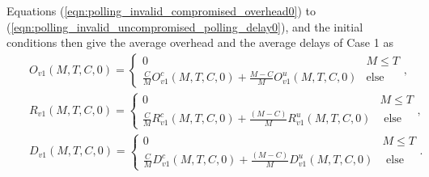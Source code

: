 \documentclass[12pt, onecolumn, draftcls]{IEEEtran}
\begin{document}
 Equations
(\ref{eqn:polling_invalid_compromised_overhead0}) to
(\ref{eqn:polling_invalid_uncompromised_polling_delay0}), and the
initial conditions then give the average overhead and the average
delays of Case 1 as
\begin{eqnarray*}
&&O_{v1}(M,T,C,0) = \left\{\begin{array}{ll} 0 & M \le T \\
\frac{C}{M}O_{v1}^c(M,T,C,0)+\frac{M-C}{M}O_{v1}^u(M,T,C,0) & \mbox{
else}
\end{array}, \right. \\
&&R_{v1}(M,T,C,0) = \left\{\begin{array}{ll} 0 & M \le T \\
\frac{C}{M}R_{v1}^c(M,T,C,0)+\frac{(M-C)}{M}R_{v1}^u(M,T,C,0) &
\mbox{ else}
\end{array}, \right.
\\
&&D_{v1}(M,T,C,0) = \left\{\begin{array}{ll} 0 & M \le T \\
\frac{C}{M}D_{v1}^c(M,T,C,0)+\frac{(M-C)}{M}D_{v1}^u(M,T,C,0) &
\mbox{ else}
\end{array}. \right.
\end{eqnarray*}
\end{document}
